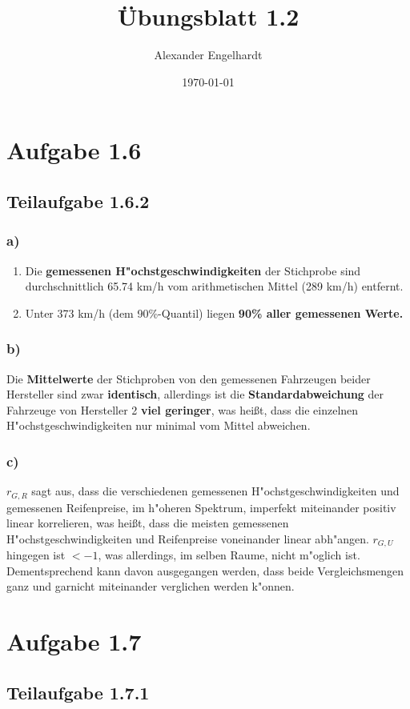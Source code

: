 \documentclass[a4paper,12pt]{article}
\title{Übungsblatt 1.2}
\author{Alexander Engelhardt}
\date{\today}
\begin{document}
	\maketitle
	
	\section*{Aufgabe 1.6}
	\subsection*{Teilaufgabe 1.6.2}
	\subsubsection*{a)}
	\begin{enumerate}
		\item Die \textbf{gemessenen H"ochstgeschwindigkeiten} der Stichprobe sind durchschnittlich 65.74 km/h vom arithmetischen Mittel (289 km/h) entfernt.
		\item Unter 373 km/h (dem 90\%-Quantil) liegen \textbf{90\% aller gemessenen Werte.}
	\end{enumerate}
	\subsubsection*{b)}
	Die \textbf{Mittelwerte} der Stichproben von den gemessenen Fahrzeugen beider Hersteller sind zwar \textbf{identisch}, allerdings ist die \textbf{Standardabweichung} der Fahrzeuge von Hersteller 2 \textbf{viel geringer}, was heißt, dass die einzelnen H"ochstgeschwindigkeiten nur minimal vom Mittel abweichen.
	\subsubsection*{c)}
	$r_{G,R}$ sagt aus, dass die verschiedenen gemessenen H"ochstgeschwindigkeiten und gemessenen Reifenpreise, im h"oheren Spektrum, imperfekt miteinander positiv linear korrelieren, was hei\ss t, dass die meisten gemessenen H"ochstgeschwindigkeiten und Reifenpreise voneinander linear abh"angen. $r_{G,U}$ hingegen ist $ < -1$, was allerdings, im selben Raume, nicht m"oglich ist. Dementsprechend kann davon ausgegangen werden, dass beide Vergleichsmengen ganz und garnicht miteinander verglichen werden k"onnen.
	\section*{Aufgabe 1.7}
	\subsection*{Teilaufgabe 1.7.1}
\end{document}
